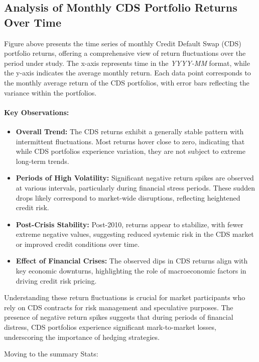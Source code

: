 \documentclass{article}
\begin{document}
\subsection{Analysis of Monthly CDS Portfolio Returns Over Time}

Figure above presents the time series of monthly Credit Default Swap (CDS) portfolio returns, offering a comprehensive view of return fluctuations over the period under study. The x-axis represents time in the \textit{YYYY-MM} format, while the y-axis indicates the average monthly return. Each data point corresponds to the monthly average return of the CDS portfolios, with error bars reflecting the variance within the portfolios.

\paragraph{Key Observations:}
\begin{itemize}
    \item \textbf{Overall Trend:} The CDS returns exhibit a generally stable pattern with intermittent fluctuations. Most returns hover close to zero, indicating that while CDS portfolios experience variation, they are not subject to extreme long-term trends.
    \item \textbf{Periods of High Volatility:} Significant negative return spikes are observed at various intervals, particularly during financial stress periods. These sudden drops likely correspond to market-wide disruptions, reflecting heightened credit risk.
    \item \textbf{Post-Crisis Stability:} Post-2010, returns appear to stabilize, with fewer extreme negative values, suggesting reduced systemic risk in the CDS market or improved credit conditions over time.
    \item \textbf{Effect of Financial Crises:} The observed dips in CDS returns align with key economic downturns, highlighting the role of macroeconomic factors in driving credit risk pricing.
\end{itemize}


Understanding these return fluctuations is crucial for market participants who rely on CDS contracts for risk management and speculative purposes. The presence of negative return spikes suggests that during periods of financial distress, CDS portfolios experience significant mark-to-market losses, underscoring the importance of hedging strategies.

Moving to the summary Stats: \\
\end{document}
